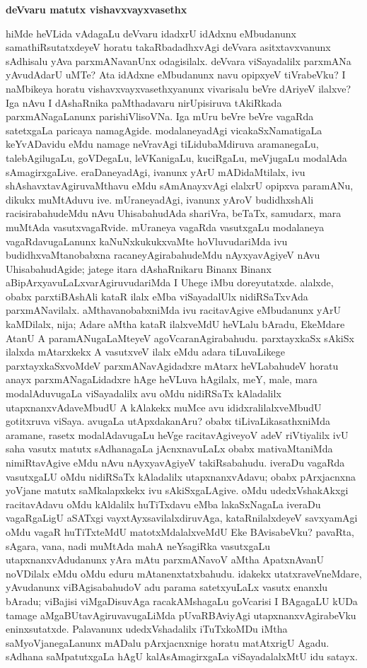 \newpage

\begin{center}
{\Large\bf deVvaru matutx vishavxvayxvasethx}
\end{center}

hiMde heVLida vAdagaLu deVvaru idadxrU idAdxnu eMbudanunx samathiRsu\-tatxdeyeV horatu takaRbadadhxvAgi deVvara asitxtavxvanunx sAdhisalu yAva parxmANavanUnx odagisilalx. deVvara viSayadalilx parxmANa yAvudAdarU uMTe? Ata idAdxne eMbu\-danunx navu opipxyeV tiVrabeVku? I naMbikeya horatu vishavxvayxvasethxyanunx vivarisalu beVre dAriyeV ilalxve? Iga nAvu I dAshaRnika paMthadavaru nirUpisiruva tAkiRkada parxmANagaLanunx parishiVlisoVNa. Iga mUru beVre beVre vagaRda satetxgaLa paricaya namagAgide. modalaneyadAgi vicakaSxNamatigaLa keYvADavidu eMdu namage neVravAgi tiLidubaMdiruva aramanegaLu, talebAgilugaLu, goVDegaLu, leVKanigaLu, kuciRgaLu, meVjugaLu modalAda sAmagirxgaLive. eraDaneyadAgi, ivanunx yArU mADidaMtilalx, ivu shAshavxtavAgiruvaMthavu eMdu sAmAnayxvAgi elalxrU opipxva paramANu, dikukx muMtAduvu ive. mUraneyadAgi, ivanunx yAroV budidhxshAli racisirabahudeMdu nAvu UhisabahudAda shariVra, beTaTx, samudarx, mara muMtAda vasutxvagaRvide. mUraneya vagaRda vasutxgaLu modalaneya vagaRdavugaLanunx kaNuNxkukukxvaMte hoVluvudariMda ivu budidhxvaMtanobabxna racaneyAgirabahudeMdu nAyxyavAgiyeV nAvu UhisabahudAgide; jatege itara dAshaRnikaru Binanx Binanx aBipArxyavuLaLxvarAgiruvudariMda I Uhege iMbu doreyutatxde. alalxde, obabx parxtiBAshAli kataR ilalx eMba viSayadalUlx nidiRSaTxvAda parxmANavilalx. aMthavanobabxniMda ivu racitavAgive eMbudanunx yArU kaMDilalx, nija; Adare aMtha kataR ilalxveMdU heVLalu bAradu, EkeMdare AtanU A paramANugaLaMteyeV agoVcaranAgirabahudu. parxtayxkaSx sAkiSx ilalxda mAtarxkekx A vasutxveV ilalx eMdu adara tiLuvaLikege parxtayxkaSxvoMdeV parxmANavAgidadxre mAtarx heVLabahudeV horatu anayx parxmANagaLidadxre hAge heVLuva hAgilalx, meY, male, mara modalAduvugaLa viSayadalilx avu oMdu nidiRSaTx kAladalilx utapxnanxvAdaveMbudU A kAlakekx muMce avu ididxralilalxveMbudU gotitxruva viSaya. avugaLa utApxdakanAru? obabx tiLivaLikasathxniMda aramane, rasetx modalAdavugaLu heVge racitavAgiveyoV adeV riVtiyalilx ivU saha vasutx matutx sAdhanagaLa jAcnxnavuLaLx obabx mativaMtaniMda nimiRtavAgive eMdu nAvu nAyxyavAgiyeV takiRsabahudu. iveraDu vagaRda vasutxgaLU oMdu nidiRSaTx kAladalilx utapxnanxvAdavu; obabx pArxjacnxna yoVjane matutx saMkalapxkekx ivu sAkiSxgaLAgive. oMdu udedxVshakAkxgi racitavAdavu oMdu kAldalilx huTiTxdavu eMba lakaSxNagaLa iveraDu vagaRgaLigU aSATxgi vayxtAyxsavilalxdiruvAga, kataRnilalxdeyeV savxyamAgi oMdu vagaR huTiTxteMdU matotxMdalalxveMdU Eke BAvisabeVku? pavaRta, sAgara, vana, nadi muMtAda mahA neYsagiRka vasutxgaLu utapxnanxvAdudanunx yAra mAtu parxmANavoV aMtha ApatxnAvanU noVDilalx eMdu oMdu eduru mAtanenxtatxbahudu. idakekx utatxraveVneMdare, yAvudanunx viBAgisabahudoV adu parama satetxyuLaLx vasutx enanxlu bAradu; viBajisi viMgaDisuvAga racakAMshagaLu goVcarisi I BAgagaLU kUDa tamage aMgaBUtavAgiruvavugaLiMda pUvaRBAviyAgi utapxnanxvAgirabeVku eninxsutatxde. Palavanunx udedxVshadalilx iTuTxkoMDu iMtha saMyoVjanegaLanunx mADalu pArxjacnxnige horatu matAtxrigU Agadu. sAdhana saMpatutxgaLa hAgU kalAsAmagirxgaLa viSayadalalxMtU idu satayx. 